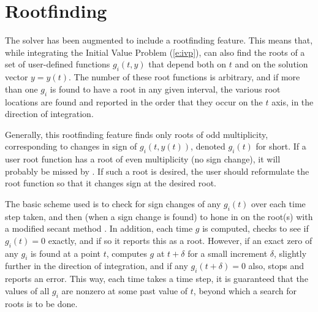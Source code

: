 \section{Rootfinding}\label{ss:rootfinding}

The {\cvodes} solver has been augmented to include a rootfinding
feature.  This means that, while integrating the Initial Value Problem
(\ref{e:ivp}), {\cvodes} can also find the roots of a set of user-defined
functions $g_i(t,y)$ that depend both on $t$ and on the solution vector
$y = y(t)$.  The number of these root functions is arbitrary, and if
more than one $g_i$ is found to have a root in any given interval, the
various root locations are found and reported in the order that they
occur on the $t$ axis, in the direction of integration.

Generally, this rootfinding feature finds only roots of odd
multiplicity, corresponding to changes in sign of $g_i(t,y(t))$,
denoted $g_i(t)$ for short.  If a user root function has a root of
even multiplicity (no sign change), it will probably be missed by
{\cvodes}.  If such a root is desired, the user should reformulate the
root function so that it changes sign at the desired root.

The basic scheme used is to check for sign changes of any $g_i(t)$ over
each time step taken, and then (when a sign change is found) to hone
in on the root(s) with a modified secant method \cite{HeSh:80}.
In addition, each time $g$ is computed, {\cvodes} checks to see if
$g_i(t) = 0$ exactly, and if so it reports this as a root.  However,
if an exact zero of any $g_i$ is found at a point $t$, {\cvodes}
computes $g$ at $t + \delta$ for a small increment $\delta$, slightly
further in the direction of integration, and if any $g_i(t + \delta)=0$
also, {\cvodes} stops and reports an error.  This way, each time
{\cvodes} takes a time step, it is guaranteed that the values of all
$g_i$ are nonzero at some past value of $t$, beyond which a search for
roots is to be done.


